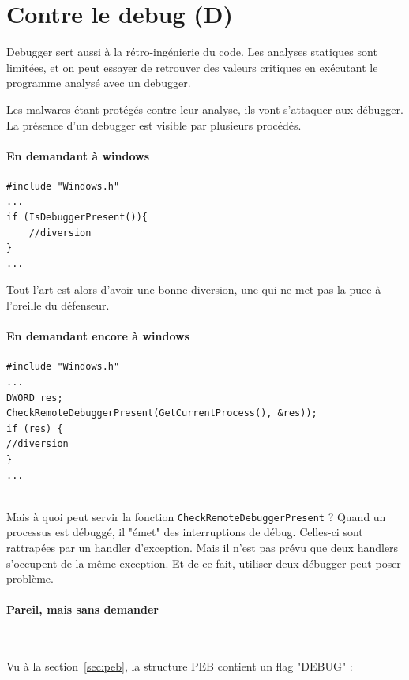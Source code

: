 \documentclass{book}
\newenvironment{commentaire}[1]{%
	\def\FrameCommand{\fboxrule=\FrameRule\fboxsep=\FrameSep \fcolorbox{yellow!50}{yellow!10}}%
	\MakeFramed {\advance\hsize-\width \FrameRestore}
	\noindent {\bf #1}\\
}%
{\endMakeFramed}
\newcommand{\code}[1]{\texttt{#1}}
\newcommand{\Windows}{{\sc windows}}
\begin{document}
\section{Contre le debug (D)}

Debugger sert aussi à la rétro-ingénierie du code. Les analyses statiques sont limitées, et on peut essayer de retrouver des valeurs critiques en exécutant le programme analysé avec un debugger. 

 Les malwares étant protégés contre leur analyse, ils vont s'attaquer aux débugger. La présence d'un debugger est visible par plusieurs procédés. 

\paragraph{En demandant à \Windows}

\begin{verbatim}
#include "Windows.h"
...
if (IsDebuggerPresent()){
	//diversion
}
...
\end{verbatim}

Tout l'art est alors d'avoir une bonne diversion, une qui ne met pas la puce à l'oreille du défenseur. 

\paragraph{En demandant encore à \Windows}

\begin{verbatim}
#include "Windows.h"
...
DWORD res;
CheckRemoteDebuggerPresent(GetCurrentProcess(), &res));
if (res) {
//diversion
}
...
\end{verbatim}

\begin{commentaire}{Mais pourquoi donc ?}
	Mais à quoi peut servir la fonction \code{CheckRemoteDebuggerPresent} ? Quand un processus est débuggé, il "émet" des interruptions de débug. Celles-ci sont rattrapées par un handler d'exception. Mais il n'est pas prévu que deux handlers s'occupent de la même exception. Et de ce fait, utiliser deux débugger peut poser problème.  
\end{commentaire}

\paragraph{Pareil, mais sans demander}~


Vu à la section~\ref{sec:peb}, la structure PEB contient un flag "DEBUG" : 
\end{document}
